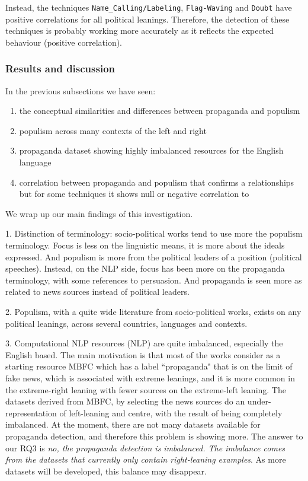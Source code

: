 Instead, the techniques \texttt{Name\_Calling/Labeling}, \texttt{Flag-Waving} and \texttt{Doubt} have positive correlations for all political leanings.
Therefore, the detection of these techniques is probably working more accurately as it reflects the expected behaviour (positive correlation).

\subsubsection{Results and discussion}

In the previous subsections we have seen:

\begin{enumerate}
    \item the conceptual similarities and differences between propaganda and populism
    \item populism across many contexts of the left and right
    \item propaganda dataset showing highly imbalanced resources for the English language
    \item correlation between propaganda and populism that confirms a relationships but for some techniques it shows null or negative correlation to 
\end{enumerate}


We wrap up our main findings of this investigation.

1. Distinction of terminology: socio-political works tend to use more the populism terminology. Focus is less on the linguistic means, it is more about the ideals expressed. And populism is more from the political leaders of a position (political speeches).
Instead, on the NLP side, focus has been more on the propaganda terminology, with some references to persuasion. And propaganda is seen more as related to news sources instead of political leaders.

2. Populism, with a quite wide literature from socio-political works, exists on any political leanings, across several countries, languages and contexts.

3. Computational NLP resources (NLP) are quite imbalanced, especially the English based. The main motivation is that most of the works consider as a starting resource MBFC which has a label ``propaganda" that is on the limit of fake news, which is associated with extreme leanings, and it is more common in the extreme-right leaning with fewer sources on the extreme-left leaning. The datasets derived from MBFC, by selecting the news sources do an under-representation of left-leaning and centre, with the result of being completely imbalanced.
At the moment, there are not many datasets available for propaganda detection, and therefore this problem is showing more.
The answer to our RQ3 is \emph{no, the propaganda detection is imbalanced. The imbalance comes from the datasets that currently only contain right-leaning examples}.
As more datasets will be developed, this balance may disappear.


